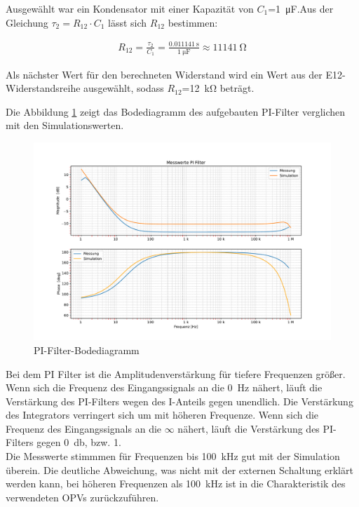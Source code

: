 Ausgewählt war ein Kondensator mit einer Kapazität von $C_1$=\SI{1}{\micro\farad}.Aus der Gleichung $\tau_2= R_{12} \cdot C_1$ lässt sich $R_{12}$ bestimmen:

\begin{align}
R_{12}=\frac{\tau_2}{C_1}=\frac{\SI{0,011141}{\second}}{\SI{1}{\micro\farad}}\approx \SI{11141}{\ohm}
\end{align}

Als nächster Wert für den berechneten Widerstand wird ein Wert aus der E12-Widerstandsreihe ausgewählt, sodass $R_{12}$=\SI{12}{\kilo\ohm} beträgt.


Die Abbildung \ref{fig:Bode} zeigt das Bodediagramm des aufgebauten PI-Filter verglichen mit den Simulationswerten.

\begin{figure}[H]
  \centering
  \includegraphics[width=0.8\linewidth]{Elektronik-Laborprotokoll_PLL/Abbildungen/PI_Filter_Bode.pdf}
  \caption{PI-Filter-Bodediagramm}
  \label{fig:Bode}
\end{figure}

Bei dem PI Filter ist die Amplitudenverstärkung für tiefere Frequenzen größer. Wenn sich die Frequenz des Eingangssignals an die \SI{0}{\hertz} nähert, läuft die Verstärkung des PI-Filters wegen des I-Anteils gegen unendlich. Die Verstärkung des Integrators verringert sich um mit höheren Frequenze.  Wenn sich die Frequenz des Eingangssignals an die $\infty$ nähert, läuft die Verstärkung des PI-Filters gegen \SI{0}{\decibel}, bzw. 1.\\
Die Messwerte stimmmen für Frequenzen bis \SI{100}{\kilo\hertz} gut mit der Simulation überein. Die deutliche Abweichung, was nicht mit der externen Schaltung erklärt werden kann, bei höheren Frequenzen als \SI{100}{\kilo\hertz} ist in die Charakteristik des verwendeten OPVs zurückzuführen.\\




